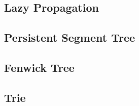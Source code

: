 \documentclass[10pt]{article}
\begin{document}
\begin{landscape}
\begin{multicols}{2}
\subsection{Lazy Propagation}


\subsection{Persistent Segment Tree}


\subsection{Fenwick Tree}


\subsection{Trie}


\end{multicols}
\end{landscape}

\end{document}
